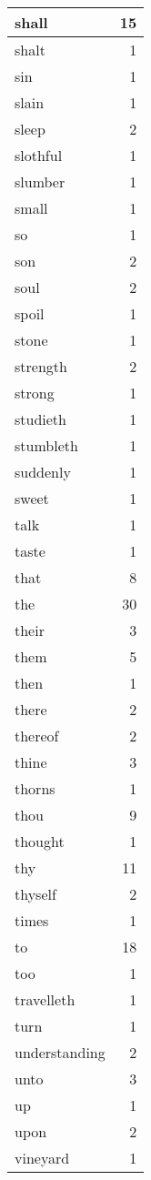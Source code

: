 \begin{center}
\begin{longtable}{l|r}
shall & 15\\ \hline 
shalt & 1\\ \hline 
sin & 1\\ \hline 
slain & 1\\ \hline 
sleep & 2\\ \hline 
slothful & 1\\ \hline 
slumber & 1\\ \hline 
small & 1\\ \hline 
so & 1\\ \hline 
son & 2\\ \hline 
soul & 2\\ \hline 
spoil & 1\\ \hline 
stone & 1\\ \hline 
strength & 2\\ \hline 
strong & 1\\ \hline 
studieth & 1\\ \hline 
stumbleth & 1\\ \hline 
suddenly & 1\\ \hline 
sweet & 1\\ \hline 
talk & 1\\ \hline 
taste & 1\\ \hline 
that & 8\\ \hline 
the & 30\\ \hline 
their & 3\\ \hline 
them & 5\\ \hline 
then & 1\\ \hline 
there & 2\\ \hline 
thereof & 2\\ \hline 
thine & 3\\ \hline 
thorns & 1\\ \hline 
thou & 9\\ \hline 
thought & 1\\ \hline 
thy & 11\\ \hline 
thyself & 2\\ \hline 
times & 1\\ \hline 
to & 18\\ \hline 
too & 1\\ \hline 
travelleth & 1\\ \hline 
turn & 1\\ \hline 
understanding & 2\\ \hline 
unto & 3\\ \hline 
up & 1\\ \hline 
upon & 2\\ \hline 
vineyard & 1\\ \hline 

\end{longtable}
\end{center}
